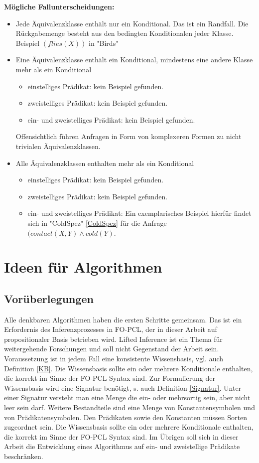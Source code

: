 \documentclass[a4paper, 11pt]{book}
\begin{document}
\textbf{Mögliche Fallunterscheidungen:}\label{Fallunterscheidung Formel MehrAequi}
	\begin{itemize}
		\item Jede Äquivalenzklasse enthält nur ein Konditional. Das ist ein Randfall. Die Rückgabemenge besteht aus den bedingten Konditionalen jeder Klasse. Beispiel $ (flies(X)) $ in "{}Birds"{}  
		\item Eine Äquivalenzklasse enthält ein Konditional, mindestens eine andere Klasse mehr als ein Konditional
		\begin{itemize}
			\item einstelliges Prädikat: kein Beispiel gefunden.
			\item zweistelliges Prädikat: kein Beispiel gefunden.
			\item ein- und zweistelliges Prädikat: kein Beispiel gefunden.
		\end{itemize}
		Offensichtlich führen Anfragen in Form von komplexeren Formen zu nicht trivialen Äquivalenzklassen. 
		\item Alle Äquivalenzklassen enthalten mehr als ein Konditional
			\begin{itemize}
			\item einstelliges Prädikat: kein Beispiel gefunden.
				\item zweistelliges Prädikat: kein Beispiel gefunden.
			\item ein- und zweistelliges Prädikat: Ein exemplarisches Beispiel hierfür findet sich in "{}ColdSpez"{} \ref{ColdSpez} für die Anfrage  $ (contact(X,Y) \land cold(Y) $.
		\end{itemize}
	\end{itemize}



\chapter{Ideen für Algorithmen} \label{Ideen Alg.}
\section{Vorüberlegungen}
Alle denkbaren Algorithmen haben die ersten Schritte gemeinsam. Das ist ein Erfordernis des Inferenzprozesses in FO-PCL, der in dieser Arbeit auf propositionaler Basis betrieben wird. Lifted Inference ist ein Thema für weitergehende Forschungen und soll nicht Gegenstand der Arbeit sein. 
Voraussetzung ist in jedem Fall eine konsistente Wissensbasis, vgl. auch Definition \ref{KB}. Die Wissensbasis sollte ein oder mehrere Konditionale enthalten, die korrekt im Sinne der FO-PCL Syntax sind. Zur Formulierung der Wissensbasis wird eine Signatur benötigt, s. auch Definition  \ref{Signatur}. Unter einer Signatur versteht man eine Menge die ein- oder mehrsortig sein, aber nicht leer sein darf. Weitere Bestandteile sind eine Menge von Konstantensymbolen und von Prädikatensymbolen. Den Prädikaten sowie den Konstanten müssen Sorten zugeordnet sein. Die Wissensbasis sollte ein oder mehrere Konditionale enthalten, die korrekt im Sinne der FO-PCL Syntax sind. Im Übrigen soll sich in dieser Arbeit die Entwicklung eines Algorithmus auf ein- und zweistellige Prädikate beschränken.
\end{document}

